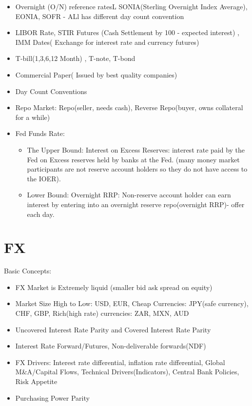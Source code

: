 \documentclass[11pt, openany]{book}              %
\begin{document}
\begin{itemize}
    \item Overnight (O/N) reference ratesL SONIA(Sterling Overnight Index Average), EONIA, SOFR - ALl has different day count convention
    \item LIBOR Rate, STIR Futures (Cash Settlement by 100 - expected interest) , IMM Dates( Exchange for interest rate and currency futures)
    \item T-bill(1,3,6,12 Month) , T-note, T-bond
    \item Commercial Paper( Issued by best quality companies)
    \item Day Count Conventions
    \item Repo Market: Repo(seller, needs cash), Reverse Repo(buyer, owns collateral for a while)
    \item Fed Funds Rate: 
    \begin{itemize}
    	\item The Upper Bound: Interest on Excess Reserves: interest rate paid by the Fed on Excess reserves held by banks at the Fed. (many money market participants are not reserve account holders so they do not have access to the IOER). 
    	\item Lower Bound: Overnight RRP: Non-reserve account holder can earn interest by entering into an overnight reserve repo(overnight RRP)- offer each day.
    \end{itemize}
\end{itemize}

\section{FX}

Basic Concepts:
\begin{itemize}
    \item FX Market is Extremely liquid (smaller bid ask spread on equity) 
    \item Market Size High to Low: USD, EUR, Cheap Currencies: JPY(safe currency), CHF, GBP, Rich(high rate) currencies: ZAR, MXN, AUD 
    \item Uncovered Interest Rate Parity and Covered Interest Rate Parity
    \item Interest Rate Forward/Futures, Non-deliverable forwards(NDF)
    \item FX Drivers: Interest rate differential, inflation rate differential, Global M\&A/Capital Flows, Technical Drivers(Indicators), Central Bank Policies, Risk Appetite
    \item Purchasing Power Parity
\end{itemize}
\end{document}
